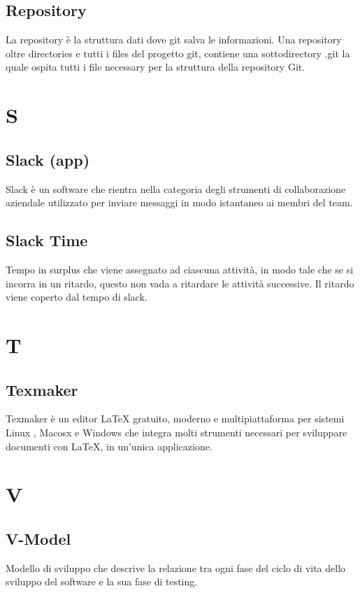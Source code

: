 	\subsection{Repository} 
	La repository è la struttura dati dove git salva le informazioni. Una repository oltre directories e tutti i files del progetto git, contiene una sottodirectory .git la quale ospita tutti i file necessary per la struttura della repository Git.



	\section{S}
	
	\subsection{Slack (app)} 
	Slack è un software che rientra nella categoria degli strumenti di collaborazione aziendale utilizzato per inviare messaggi in modo istantaneo ai membri del team.
	
	\subsection{Slack Time}
	
	Tempo in surplus che viene assegnato ad ciascuna attività, in modo tale che se si incorra in un ritardo, questo non vada a ritardare le attività successive. Il ritardo viene coperto dal tempo di slack.
	
	\section{T}
	\subsection{Texmaker} 
	Texmaker è un editor LaTeX gratuito, moderno e multipiattaforma per sistemi Linux , Macosx e Windows che integra molti strumenti necessari per sviluppare documenti con LaTeX, in un'unica applicazione. 
	
	
	\section{V}
	\subsection{V-Model} 
	Modello di sviluppo che descrive la relazione tra ogni fase del ciclo di vita dello sviluppo del software e la sua fase di testing.
	
